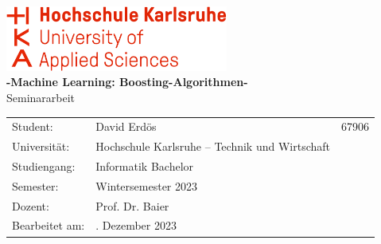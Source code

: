 \documentclass[11pt]{article}
\begin{document}
\begin{titlepage}
    \begin{center}
        \includegraphics[width=0.55\textwidth]{Images/Template/HsKa_new.png}\\[16ex]
        \huge{\textbf{-Machine Learning: Boosting-Algorithmen-}\\Seminararbeit}\\[8ex]
        \normalsize{}
        \begin{tabular}{lll}
            Student:            & \quad David Erdös                               & 67906 \\[2ex]
            Universität:        & \quad Hochschule Karlsruhe – Technik und Wirtschaft   &       \\[2ex]
            Studiengang:        & \quad Informatik Bachelor             &       \\[2ex]
            Semester:           & \quad Wintersemester 2023                             &       \\[2ex]
            Dozent:             & \quad Prof. Dr. Baier                       &       \\[2ex]
            Bearbeitet am:      & \quad 1. Dezember 2023                             &       \\[2ex]
        \end{tabular}
    \end{center}
\end{titlepage}
\newpage

\tableofcontents
\newpage
{}












\newpage    
\printglossaries{}

\newpage                                          
\printbibliography[heading=bibintoc, title={Literaturverzeichnis}]

\newpage
\listoffigures
{}
\newpage
\listoftables
{}
\end{document}
